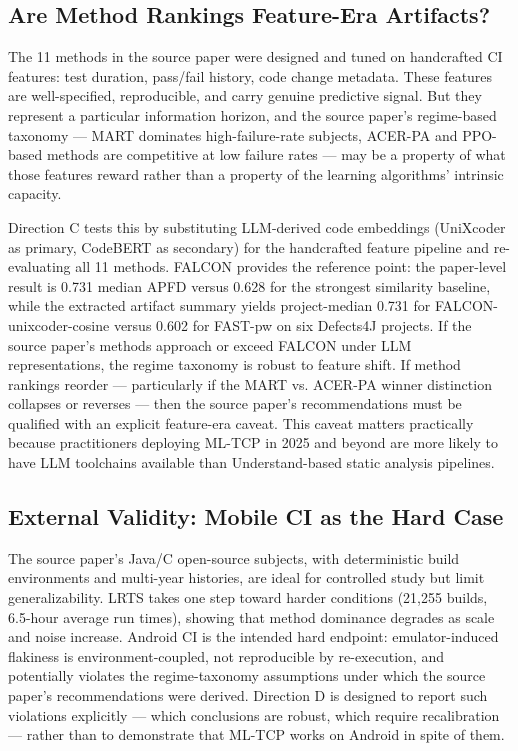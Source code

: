 \documentclass[conference]{IEEEtran}
\begin{document}
\subsection{Are Method Rankings Feature-Era Artifacts?}

The 11 methods in the source paper were designed and tuned on handcrafted CI features: test duration, pass/fail history, code change metadata. These features are well-specified, reproducible, and carry genuine predictive signal. But they represent a particular information horizon, and the source paper's regime-based taxonomy — MART dominates high-failure-rate subjects, ACER-PA and PPO-based methods are competitive at low failure rates — may be a property of what those features reward rather than a property of the learning algorithms' intrinsic capacity.


Direction C tests this by substituting LLM-derived code embeddings (UniXcoder as primary, CodeBERT as secondary) for the handcrafted feature pipeline and re-evaluating all 11 methods. FALCON provides the reference point: the paper-level result is 0.731 median APFD versus 0.628 for the strongest similarity baseline, while the extracted artifact summary yields project-median 0.731 for FALCON-unixcoder-cosine versus 0.602 for FAST-pw on six Defects4J projects. If the source paper's methods approach or exceed FALCON under LLM representations, the regime taxonomy is robust to feature shift. If method rankings reorder — particularly if the MART vs. ACER-PA winner distinction collapses or reverses — then the source paper's recommendations must be qualified with an explicit feature-era caveat. This caveat matters practically because practitioners deploying ML-TCP in 2025 and beyond are more likely to have LLM toolchains available than Understand-based static analysis pipelines.


\subsection{External Validity: Mobile CI as the Hard Case}

The source paper's Java/C open-source subjects, with deterministic build environments and multi-year histories, are ideal for controlled study but limit generalizability. LRTS takes one step toward harder conditions (21,255 builds, 6.5-hour average run times), showing that method dominance degrades as scale and noise increase. Android CI is the intended hard endpoint: emulator-induced flakiness is environment-coupled, not reproducible by re-execution, and potentially violates the regime-taxonomy assumptions under which the source paper's recommendations were derived. Direction D is designed to report such violations explicitly --- which conclusions are robust, which require recalibration --- rather than to demonstrate that ML-TCP works on Android in spite of them.
\end{document}
